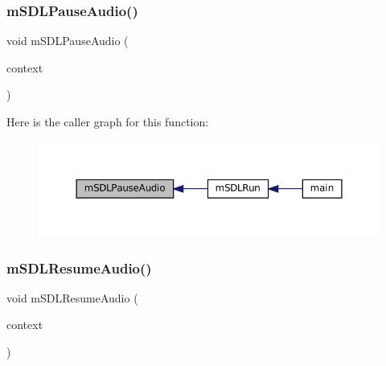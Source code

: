 \subsubsection{\texorpdfstring{m\+S\+D\+L\+Pause\+Audio()}{mSDLPauseAudio()}}
{\footnotesize\ttfamily void m\+S\+D\+L\+Pause\+Audio (\begin{DoxyParamCaption}\item[{struct \mbox{\hyperlink{sdl-audio_8h_structm_s_d_l_audio}{m\+S\+D\+L\+Audio}} $\ast$}]{context }\end{DoxyParamCaption})}

Here is the caller graph for this function\+:
\nopagebreak
\begin{figure}[H]
\begin{center}
\leavevmode
\includegraphics[width=350pt]{sdl-audio_8h_a6fd4770ab1d4825f5f3231ce155d4696_icgraph}
\end{center}
\end{figure}
\mbox{\label{sdl-audio_8h_aec2e6fbd9b73db60bf1dee6113caeb03}} 
\subsubsection{\texorpdfstring{m\+S\+D\+L\+Resume\+Audio()}{mSDLResumeAudio()}}
{\footnotesize\ttfamily void m\+S\+D\+L\+Resume\+Audio (\begin{DoxyParamCaption}\item[{struct \mbox{\hyperlink{sdl-audio_8h_structm_s_d_l_audio}{m\+S\+D\+L\+Audio}} $\ast$}]{context }\end{DoxyParamCaption})}

